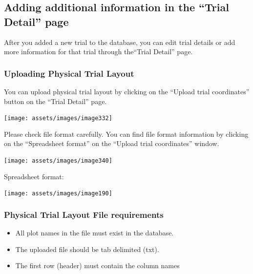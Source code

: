 \documentclass[
  12pt,
]{book}
\begin{document}
\hypertarget{adding-additional-information-in-the-trial-detail-page}{%
\subsection{Adding additional information in the ``Trial Detail'' page}\label{adding-additional-information-in-the-trial-detail-page}}

After you added a new trial to the database, you can edit trial details or add more information for that trial through the``Trial Detail'' page.

\hypertarget{uploading-physical-trial-layout}{%
\subsubsection*{Uploading Physical Trial Layout}\label{uploading-physical-trial-layout}}


You can upload physical trial layout by clicking on the ``Upload trial coordinates'' button on the ``Trial Detail'' page.

\begin{center}\texttt{[image: assets/images/image332]} \end{center}

Please check file format carefully. You can find file format information by clicking on the ``Spreadsheet format'' on the ``Upload trial coordinates'' window.

\begin{center}\texttt{[image: assets/images/image340]} \end{center}

Spreadsheet format:

\begin{center}\texttt{[image: assets/images/image190]} \end{center}

\hypertarget{physical-trial-layout-file-requirements}{%
\subsubsection*{Physical Trial Layout File requirements}\label{physical-trial-layout-file-requirements}}


\begin{itemize}
\item
  All plot names in the file must exist in the database.
\item
  The uploaded file should be tab delimited (txt).
\item
  The first row (header) must contain the column names
\end{itemize}
\end{document}
